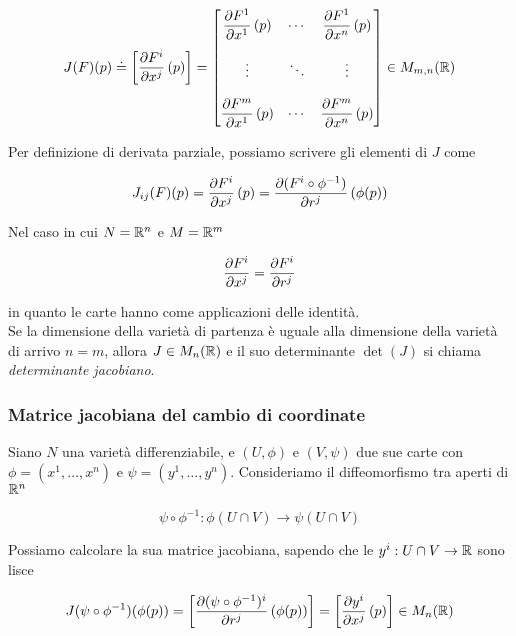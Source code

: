 \begin{equation}
	J(F)(p) \doteq \left[ \pdv{F^{i}}{x^{j}} \, (p) \right] %
	= \bmqty{ %
				\dpdv{F^{1}}{x^{1}} \, (p) & \cdots & \dpdv{F^{1}}{x^{n}} \, (p) \\\\
				\vdots & \ddots & \vdots \\\\
				\dpdv{F^{m}}{x^{1}} \, (p) & \cdots & \dpdv{F^{m}}{x^{n}} \, (p)
		 		} %
	\in M_{m,n}(\R)
\end{equation}

Per definizione di derivata parziale, possiamo scrivere gli elementi di $ J $ come

\begin{equation}
	J_{ij}(F)(p) = \pdv{F^{i}}{x^{j}} \, (p) = \pdv{(F^{i} \circ \phi^{-1})}{r^{j}} \, (\phi(p))
\end{equation}

Nel caso in cui $ N = \mathbb{R}^{n} $ e $ M = \mathbb{R}^{m} $

\begin{equation}
	\pdv{F^{i}}{x^{j}} = \pdv{F^{i}}{r^{j}}
\end{equation}

in quanto le carte hanno come applicazioni delle identità.\\
Se la dimensione della varietà di partenza è uguale alla dimensione della varietà di arrivo $ n=m $, allora $ J \in M_{n}(\mathbb{R}) $ e il suo determinante $ \det(J) $ si chiama \textit{determinante jacobiano}.

\subsubsection{Matrice jacobiana del cambio di coordinate}

Siano $ N $ una varietà differenziabile, e $ (U,\phi) $ e $ (V,\psi) $ due sue carte con $ \phi = (x^{1},\dots,x^{n}) $ e $ \psi = (y^{1},\dots,y^{n}) $. Consideriamo il diffeomorfismo tra aperti di $ \mathbb{R}^{n} $

\begin{equation}
	\psi \circ \phi^{-1} : \phi(U \cap V) \to \psi(U \cap V)
\end{equation}

Possiamo calcolare la sua matrice jacobiana, sapendo che le $ y^{i} : U \cap V \to \mathbb{R} $ sono lisce

\begin{equation}
	J(\psi \circ \phi^{-1})(\phi(p)) = \left[ \pdv{(\psi \circ \phi^{-1})^{i}}{r^{j}} \, (\phi(p)) \right] %
	= \left[ \pdv{y^{i}}{x^{j}} \, (p) \right] \in M_{n}(\R)
\end{equation}

